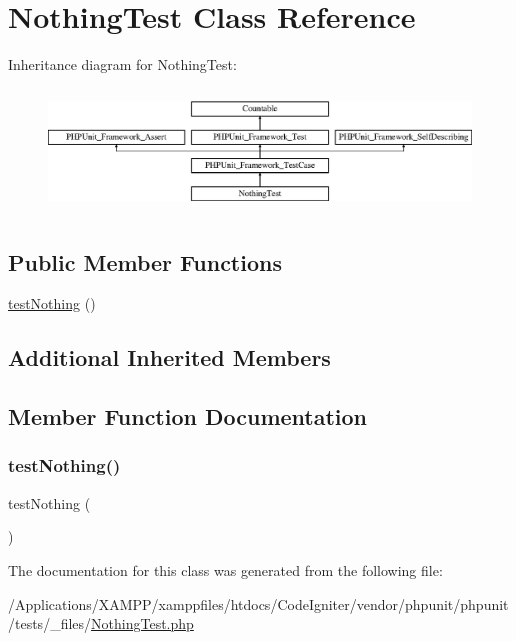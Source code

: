 \hypertarget{class_nothing_test}{}\section{Nothing\+Test Class Reference}
\label{class_nothing_test}
Inheritance diagram for Nothing\+Test\+:\begin{figure}[H]
\begin{center}
\leavevmode
\includegraphics[height=3.303835cm]{class_nothing_test}
\end{center}
\end{figure}
\subsection*{Public Member Functions}
\begin{DoxyCompactItemize}
\item 
\mbox{\hyperlink{class_nothing_test_aaf50ae2758b5dfb45e08bdd224170d8e}{test\+Nothing}} ()
\end{DoxyCompactItemize}
\subsection*{Additional Inherited Members}


\subsection{Member Function Documentation}
\mbox{\label{class_nothing_test_aaf50ae2758b5dfb45e08bdd224170d8e}} 
\subsubsection{\texorpdfstring{test\+Nothing()}{testNothing()}}
{\footnotesize\ttfamily test\+Nothing (\begin{DoxyParamCaption}{ }\end{DoxyParamCaption})}



The documentation for this class was generated from the following file\+:\begin{DoxyCompactItemize}
\item 
/\+Applications/\+X\+A\+M\+P\+P/xamppfiles/htdocs/\+Code\+Igniter/vendor/phpunit/phpunit/tests/\+\_\+files/\mbox{\hyperlink{_nothing_test_8php}{Nothing\+Test.\+php}}\end{DoxyCompactItemize}
